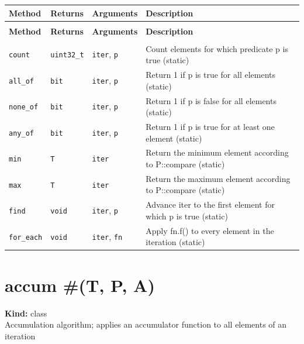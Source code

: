 \documentclass[11pt,letterpaper]{report}
\begin{document}
\begin{xltabular}{\linewidth}{>{\small}p{1.35in} >{\small}p{1.25in} >{\small}p{0.95in} >{\small}X}
\toprule
\textbf{Method} & \textbf{Returns} & \textbf{Arguments} & \textbf{Description} \\
\midrule
\endfirsthead
{} \\
\midrule
\textbf{Method} & \textbf{Returns} & \textbf{Arguments} & \textbf{Description} \\
\midrule
\endhead
\midrule
{} \\
\endfoot
\bottomrule
\endlastfoot
\texttt{count} & \texttt{uint32\_t} & \texttt{iter}, \texttt{p} & Count elements for which predicate p is true (static) \\
\texttt{all\_of} & \texttt{bit} & \texttt{iter}, \texttt{p} & Return 1 if p is true for all elements (static) \\
\texttt{none\_of} & \texttt{bit} & \texttt{iter}, \texttt{p} & Return 1 if p is false for all elements (static) \\
\texttt{any\_of} & \texttt{bit} & \texttt{iter}, \texttt{p} & Return 1 if p is true for at least one element (static) \\
\texttt{min} & \texttt{T} & \texttt{iter} & Return the minimum element according to P::compare (static) \\
\texttt{max} & \texttt{T} & \texttt{iter} & Return the maximum element according to P::compare (static) \\
\texttt{find} & \texttt{void} & \texttt{iter}, \texttt{p} & Advance iter to the first element for which p is true (static) \\
\texttt{for\_each} & \texttt{void} & \texttt{iter}, \texttt{fn} & Apply fn.f() to every element in the iteration (static) \\
\end{xltabular}

\section{accum \#(T, P, A)}
\label{cls:accumTPA}

\noindent\textbf{Kind:} class\\
\noindent Accumulation algorithm; applies an accumulator function to all elements of an iteration
\end{document}
